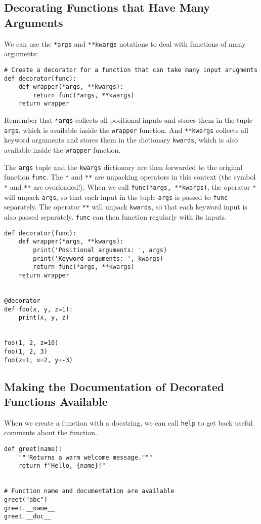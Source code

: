 \documentclass[12pt, a4paper]{article}
\begin{document}
\subsection{Decorating Functions that Have Many Arguments}
\label{sec:org2853ac9}
We can use the \texttt{*args} and \texttt{**kwargs} notations to deal with functions of many arguments:
\lstset{language=jupyter-python,label= ,caption= ,captionpos=b,numbers=none}
\begin{lstlisting}
# Create a decorator for a function that can take many input arugments
def decorator(func):
    def wrapper(*args, **kwargs):
        return func(*args, **kwargs)
    return wrapper
\end{lstlisting}
Remember that \texttt{*args} collects all positional inputs and stores them in the tuple \texttt{args}, which is available inside the \texttt{wrapper} function.
And \texttt{**kwargs} collects all keyword arguments and stores them in the dictionary \texttt{kwards}, which is also available inside the \texttt{wrapper} function.

The \texttt{args} tuple and the \texttt{kwargs} dictionary are then forwarded to the original function \texttt{func}.
The \texttt{*} and \texttt{**} are unpacking operators in this context (the symbol \texttt{*} and \texttt{**} are overloaded!).
When we call \texttt{func(*args, **kwargs)}, the operator \texttt{*} will unpack \texttt{args}, so that each input in the tuple \texttt{args} is passed to \texttt{func} separately.
The operator \texttt{**} will unpack \texttt{kwards}, so that each keyword input is also passed separately.
\texttt{func} can then function regularly with its inputs.
\lstset{language=jupyter-python,label= ,caption= ,captionpos=b,numbers=none}
\begin{lstlisting}
def decorator(func):
    def wrapper(*args, **kwargs):
        print('Positional arguments: ', args)
        print('Keyword arguments: ', kwargs)
        return func(*args, **kwargs)
    return wrapper


@decorator
def foo(x, y, z=1):
    print(x, y, z)


foo(1, 2, z=10)
foo(1, 2, 3)
foo(z=1, x=2, y=-3)
\end{lstlisting}
\subsection{Making the Documentation of Decorated Functions Available}
\label{sec:orgf548609}
When we create a function with a docstring, we can call \texttt{help} to get back useful comments about the function.
\lstset{language=jupyter-python,label= ,caption= ,captionpos=b,numbers=none}
\begin{lstlisting}
def greet(name):
    """Returns a warm welcome message."""
    return f"Hello, {name}!"


# Function name and documentation are available
greet("abc")
greet.__name__
greet.__doc__
\end{lstlisting}
\end{document}
